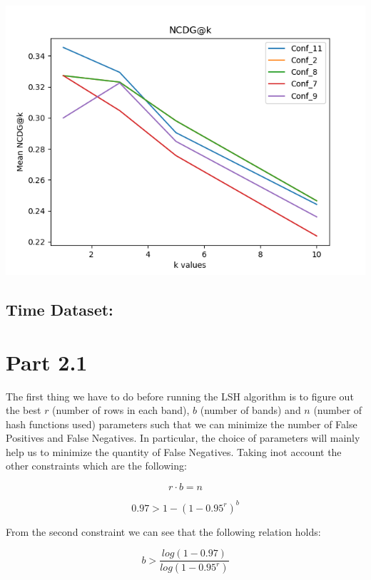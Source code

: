 \documentclass[12pt]{article}
\begin{document}
\begin{center}
\includegraphics[scale=.75]{NCDGk.png}
\end{center}


\subsection{Time Dataset:}


\section{Part 2.1}

The first thing we have to do before running the LSH algorithm is to figure out the best $r$ (number of rows in each band), $b$ (number of bands) and $n$ (number of hash functions used) parameters such that we can minimize the number of False Positives and False Negatives. In particular, the choice of parameters will mainly help us to minimize the quantity of False Negatives. Taking inot account the other constraints which are the following:

\begin{equation}
r \cdot b = n
\end{equation}


\begin{equation}
0.97 > 1 - (1-0.95^r)^b
\end{equation}

From the second constraint we can see that the following relation holds:

\begin{equation}
b > \frac{log(1-0.97)}{log(1-0.95^r)}
\end{equation}
\end{document}
